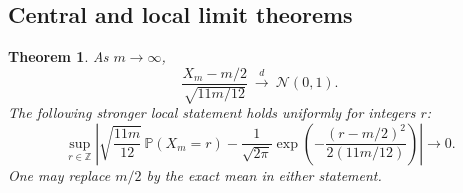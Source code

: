 \documentclass[11pt]{article}
\newtheorem{theorem}{Theorem}[section]
\theoremstyle{definition}\newtheorem{definition}[theorem]{Definition}
\theoremstyle{remark}\newtheorem{remark}[theorem]{Remark}
\newcommand{\Z}{\mathbb Z}
\newcommand{\Prob}{\mathbb P}
\begin{document}
\subsection{Central and local limit theorems}
\begin{theorem}\label{thm:CLT}
As $m\to\infty$,
\begin{equation}\label{eq:CLT}
 \frac{X_m-m/2}{\sqrt{11m/12}}
 \ \xrightarrow{\ d\ }\ \mathcal N(0,1).
\end{equation}
The following stronger local statement holds uniformly for integers $r$:
\begin{equation}\label{eq:LCLT}
 \sup_{r\in\Z}\left|
 \sqrt{\frac{11m}{12}}\,\Prob(X_m=r)
 -\frac1{\sqrt{2\pi}}
  \exp\!\left(-\frac{(r-m/2)^2}{2(11m/12)}\right)
 \right|\longrightarrow0.
\end{equation}
One may replace $m/2$ by the exact mean in either statement.
\end{theorem}
\end{document}
